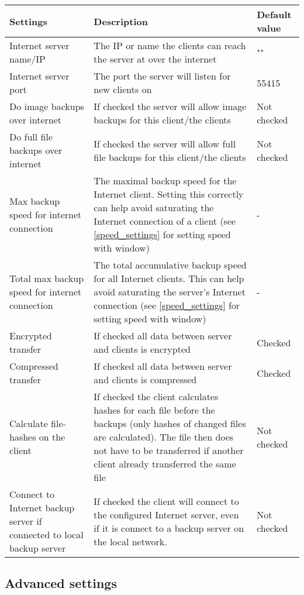 \documentclass[a4paper,10pt]{article}
\begin{document}
\begin{tabular}{|p{}|p{}|p{}|}
\hline
Settings  & Description & Default value\\
\hline\hline
Internet server name/IP & The IP or name the clients can reach the server at over the internet & ""\\
\hline
Internet server port & The port the server will listen for new clients on & 55415 \\
\hline
Do image backups over internet & If checked the server will allow image backups for this client/the clients & Not checked \\
\hline
Do full file backups over internet & If checked the server will allow full file backups for this client/the clients & Not checked \\
\hline
Max backup speed for internet connection & The maximal backup speed for the Internet client. Setting this correctly can help avoid saturating the Internet connection of a client (see \ref{speed_settings} for setting speed with window) & - \\
\hline
Total max backup speed for internet connection & The total accumulative backup speed for all Internet clients. This can help avoid saturating the server's Internet connection (see \ref{speed_settings} for setting speed with window) & - \\
\hline
Encrypted transfer & If checked all data between server and clients is encrypted & Checked \\
\hline
Compressed transfer & If checked all data between server and clients is compressed & Checked \\
\hline
Calculate file-hashes on the client & If checked the client calculates hashes for each file before the backups (only hashes of changed files are calculated).
The file then does not have to be transferred if another client already transferred the same file & Not checked \\
\hline
Connect to Internet backup server if connected to local backup server & If checked the client will connect to the configured Internet server, even if it is connect to a backup server on the local network. & Not checked \\
\hline
\end{tabular}

\subsection{Advanced settings}
\end{document}

